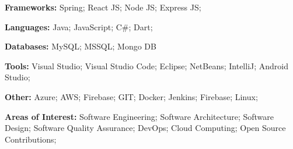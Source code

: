 

\begin{cventries}

  \cventryTec
  {
    \begin{cvitems} %
      \item {\textbf{Frameworks:} Spring; React JS; Node JS; Express JS;}
      \item {\textbf{Languages:} Java; JavaScript; C\#; Dart;}
      \item {\textbf{Databases:} MySQL; MSSQL; Mongo DB}
      \item {\textbf{Tools:} Visual Studio; Visual Studio Code; Eclipse; NetBeans; IntelliJ; Android Studio;}
      \item {\textbf{Other:} Azure; AWS; Firebase; GIT; Docker; Jenkins; Firebase; Linux;}
      \item {\textbf{Areas of Interest:} Software Engineering; Software Architecture; Software Design; Software Quality Assurance; DevOps; Cloud Computing; Open Source Contributions;}
    \end{cvitems}
  }



\end{cventries}
